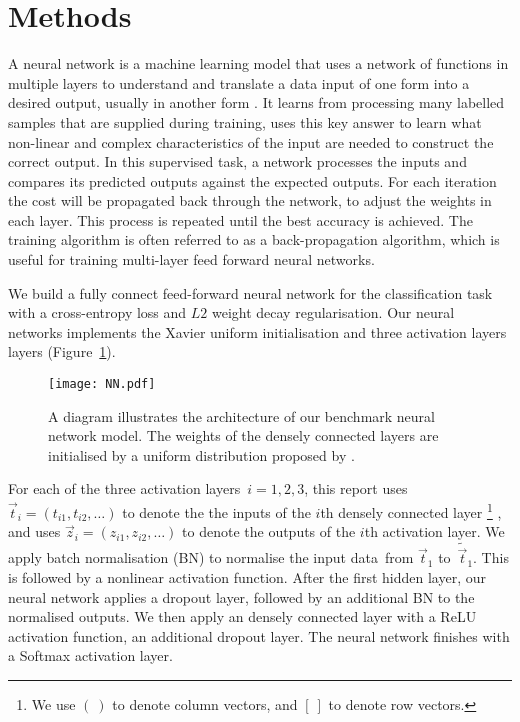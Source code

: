\section{Methods \label{chapter2}}
A neural network is a machine learning model that uses a network of functions in multiple layers to understand and translate a data input of one form into a desired output,
usually in another form \citep{Bishop:2006:PRM:1162264}.
It learns from processing many labelled samples that are supplied during training, uses this key answer to learn what non-linear and complex characteristics of the input are needed to construct the correct output.
In this supervised task,
a network processes the inputs and compares its predicted outputs against the expected outputs.
For each iteration the cost will be propagated back through the network,
to adjust the weights in each layer.
This process is repeated until the best accuracy is achieved.
The training algorithm is often referred to as a back-propagation algorithm,
which is useful for training multi-layer feed forward neural networks.

We build a fully connect feed-forward neural network for the classification task with a cross-entropy loss and $L2$ weight decay regularisation. Our neural networks implements the Xavier uniform initialisation and three activation layers layers (Figure~\ref{fig:nn}). 
\begin{figure}
    \centering
    \texttt{[image: NN.pdf]}
    \caption{A diagram illustrates the architecture of our benchmark neural network model. The weights of the densely connected layers are initialised by a uniform distribution proposed by \citet{pmlr-v9-glorot10a}.}
    \label{fig:nn}
\end{figure}
For each of the three activation layers~$i=1,2,3$, this report uses $\vec t_i=(t_{i1},t_{i2},\ldots)$ to denote the the inputs of the $i$th densely connected layer
\footnote{We use $(\ )$ to denote column vectors, and $[\ ]$ to denote row vectors.}
, and uses $\vec z_i=(z_{i1},z_{i2},\ldots)$ to denote the outputs of the $i$th activation layer. 
We apply batch normalisation (BN) to normalise the input data~from $\vec t_1$ to~$\tilde{\vec t}_1$. This is followed by a nonlinear activation function. After the first hidden layer, our neural network applies a dropout layer, followed by an additional BN to the normalised outputs. 
We then apply an densely connected layer with a ReLU activation function, an additional dropout layer. The neural network finishes with a Softmax activation layer. 

